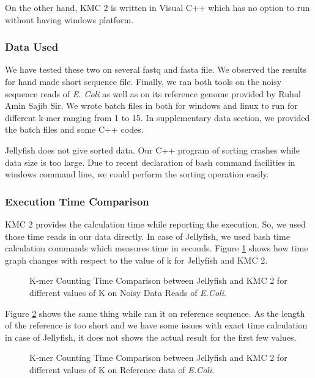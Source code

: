 \documentclass{standalone}
\begin{document}
On the other hand, KMC 2 is written in Visual C++ which has no option to run without having windows platform.

\subsubsection{Data Used}
We have tested these two on several fastq and fasta file. We observed the results for hand made short sequence file. Finally, we ran both tools on the noisy sequence reads of \emph{E. Coli} as well as on its reference genome provided by Ruhul Amin Sajib Sir. We wrote batch files in both for windows and linux to run for different k-mer ranging from 1 to 15. In supplementary data section, we provided the batch files and some C++ codes.

Jellyfish does not give sorted data. Our C++ program of sorting crashes while data size is too large. Due to recent declaration of bash command facilities in windows command line, we could perform the sorting operation easily.

\subsubsection{Execution Time Comparison}
KMC 2 provides the calculation time while reporting the execution. So, we used those time reads in our data directly. In case of Jellyfish, we used bash time calculation commands which measures time in seconds. Figure \ref{fig:TC1} shows how time graph changes with respect to the value of k for Jellyfish and KMC 2. 
\begin{figure}[ht]
	\centering
	\caption{K-mer Counting Time Comparison between Jellyfish and KMC 2 for different values of K on Noisy Data Reads of \emph{E.Coli}.}
	\label{fig:TC1}
\end{figure}
Figure \ref{fig:TC2} shows the same thing while ran it on reference sequence. As the length of the reference is too short and we have some issues with exact time calculation in case of Jellyfish, it does not shows the actual result for the first few values.
\begin{figure}[ht]
	\centering
	\caption{K-mer Counting Time Comparison between Jellyfish and KMC 2 for different values of K on Reference data of \emph{E.Coli}.}
	\label{fig:TC2}
\end{figure}
\end{document}
